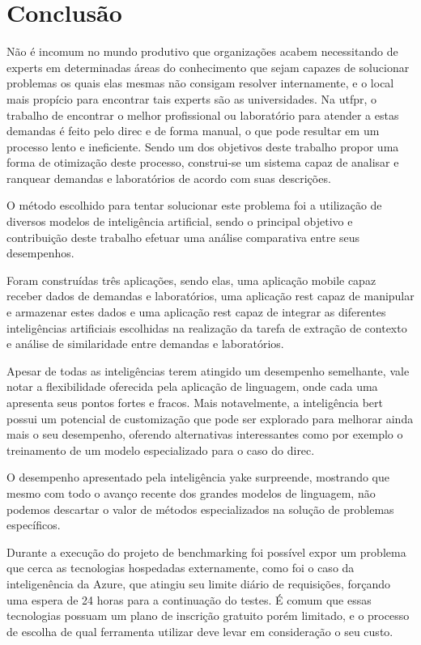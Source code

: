 \chapter{Conclusão}\label{cap:conclusoes}

Não é incomum no mundo produtivo que organizações acabem necessitando de experts em determinadas áreas do conhecimento que sejam capazes de solucionar problemas os quais elas mesmas não consigam resolver internamente, e o local mais propício para encontrar tais experts são as universidades. Na \gls{utfpr}, o trabalho de encontrar o melhor profissional ou laboratório para atender a estas demandas é feito pelo \gls{direc} e de forma manual, o que pode resultar em um processo lento e ineficiente. Sendo um dos objetivos deste trabalho propor uma forma de otimização deste processo, construi-se um sistema capaz de analisar e ranquear demandas e laboratórios de acordo com suas descrições.

O método escolhido para tentar solucionar este problema foi a utilização de diversos modelos de inteligência artificial, sendo o principal objetivo e contribuição deste trabalho efetuar uma análise comparativa entre seus desempenhos.

Foram construídas três aplicações, sendo elas, uma aplicação mobile capaz receber dados de demandas e laboratórios, uma aplicação \gls{rest} capaz de manipular e armazenar estes dados e uma aplicação \gls{rest} capaz de integrar as diferentes inteligências artificiais escolhidas na realização da tarefa de extração de contexto e análise de similaridade entre demandas e laboratórios.

Apesar de todas as inteligências terem atingido um desempenho semelhante, vale notar a flexibilidade oferecida pela aplicação de linguagem, onde cada uma apresenta seus pontos fortes e fracos. Mais notavelmente, a inteligência \gls{bert} possui um potencial de customização que pode ser explorado para melhorar ainda mais o seu desempenho, oferendo alternativas interessantes como por exemplo o treinamento de um modelo especializado para o caso do \gls{direc}.

O desempenho apresentado pela inteligência \gls{yake} surpreende, mostrando que mesmo com todo o avanço recente dos grandes modelos de linguagem, não podemos descartar o valor de métodos especializados na solução de problemas específicos.

Durante a execução do projeto de benchmarking foi possível expor um problema que cerca as tecnologias hospedadas externamente, como foi o caso da inteligenência da Azure, que atingiu seu limite diário de requisições, forçando uma espera de 24 horas para a continuação do testes. É comum que essas tecnologias possuam um plano de inscrição gratuito porém limitado, e o processo de escolha de qual ferramenta utilizar deve levar em consideração o seu custo. 

